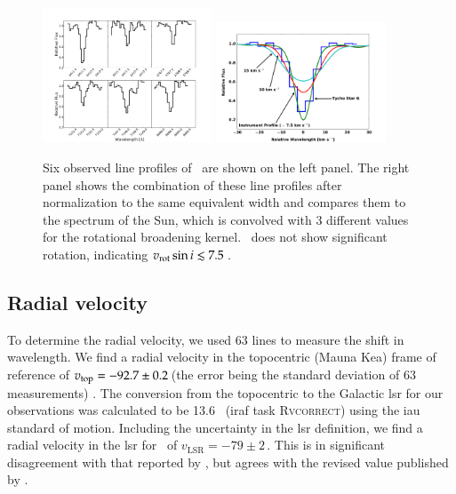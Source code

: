 \begin{figure}[h!]
\centering
\includegraphics*[width=0.45\textwidth]{chapter_sn1572_starg/plots/precombobj_sn1572.pdf}
\includegraphics*[width=0.45\textwidth]{chapter_sn1572_starg/plots/rotcomp_subaru_starg.pdf}
\caption[Rotation of Tycho-G from HDS spectrum]{Six observed  line profiles of  \starg\ are shown on the left panel. The right panel shows the combination of these line profiles after normalization to the same equivalent width and compares them to the spectrum of the Sun, which is convolved with 3 different values for the rotational broadening kernel. \starg\ does not show significant rotation, indicating $v_{\rm{rot}} \sin{i} \lesssim 7.5$\,\kms.}
\label{fig:sunobjrot}
\end{figure}

\subsection{Radial velocity}

To determine the radial velocity, we used 63 lines to measure the shift
in wavelength. We find a radial velocity in the topocentric (Mauna
Kea) frame of reference of $v_{\rm top} = - 92.7 \pm 0.2$\,\kms (the
error being the standard deviation of 63 measurements) . The
conversion from the topocentric to the Galactic \gls{lsr} for our
observations was calculated to be 13.6 \kms\ (\gls{iraf} task \textsc{Rvcorrect})
using the \gls{iau} standard of motion. Including the uncertainty in the \gls{lsr}
definition, we find a radial velocity in the \gls{lsr} for \starg\ of
$v_\textrm{LSR} = -79 \pm 2$\,\kms. This is in significant disagreement
with that reported by \rl, but agrees with the revised value published by \gh.


